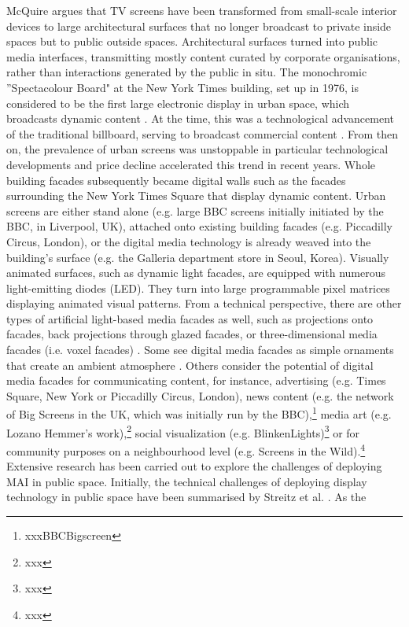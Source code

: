 McQuire \cite{McQuire2006} argues that TV screens have been transformed from small-scale
interior devices to large architectural surfaces that no longer broadcast to private
inside spaces but to public outside spaces. Architectural surfaces turned into public
media interfaces, transmitting mostly content curated by corporate organisations,
rather than interactions generated by the public in situ. The monochromic
''Spectacolour Board" at the New York Times building, set up in 1976, is considered
to be the first large electronic display in urban space, which broadcasts
dynamic content \cite {McQuire2009}. At the time, this was a technological
advancement of the traditional billboard, serving to broadcast commercial content
\cite{Huhtamo2009}. From then on, the prevalence of urban screens was unstoppable
in particular technological developments and price decline accelerated this trend
in recent years. Whole building facades subsequently became digital walls such as
the facades surrounding the New York Times Square that display dynamic content.
Urban screens are either stand alone (e.g. large BBC screens initially initiated
by the BBC, in Liverpool, UK), attached onto existing building facades (e.g.
Piccadilly Circus, London), or the digital media technology is already weaved into
the building’s surface (e.g. the Galleria department store in Seoul, Korea). Visually
animated surfaces, such as dynamic light facades, are equipped with numerous
light-emitting diodes (LED). They turn into large programmable pixel matrices
displaying animated visual patterns. From a technical perspective, there are other
types of artificial light-based media facades as well, such as projections onto
facades, back projections through glazed facades, or three-dimensional media facades (i.e. voxel facades) \cite{Haeusler2009}. Some see digital media facades as
simple ornaments that create an ambient atmosphere \cite{Caspary2009}. Others consider
the potential of digital media facades for communicating content, for
instance, advertising (e.g. Times Square, New York or Piccadilly Circus, London),
news content (e.g. the network of Big Screens in the UK, which was initially run
by the BBC),\footnote{xxxBBCBigscreen} media art (e.g. Lozano Hemmer’s work),\footnote{xxx} social visualization (e.g.
BlinkenLights)\footnote{xxx} or for community purposes on a neighbourhood level
(e.g. Screens in the Wild).\footnote{xxx}
Extensive research has been carried out to explore the challenges of deploying
MAI in public space. Initially, the technical challenges of deploying display
technology in public space have been summarised by Streitz et al. \cite{Streitz2003}. As the
